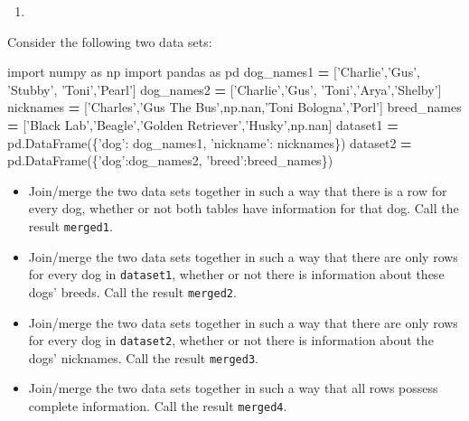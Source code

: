 \documentclass[12pt,krantz2]{krantz}
\makeatletter
\newenvironment{Shaded}{\begin{snugshade}}{\end{snugshade}}
\newcommand{\ImportTok}[1]{#1}
\newcommand{\NormalTok}[1]{#1}
\newcommand{\OperatorTok}[1]{\textcolor[rgb]{0.43,0.43,0.43}{\textbf{#1}}}
\newcommand{\StringTok}[1]{\textcolor[rgb]{0.5,0.5,0.5}{#1}}
\providecommand{\tightlist}{%
  \setlength{\itemsep}{0pt}\setlength{\parskip}{0pt}}
\newenvironment{kframe}{%
\medskip{}
\setlength{\fboxsep}{.8em}
 \def\at@end@of@kframe{}%
 \ifinner\ifhmode%
  \def\at@end@of@kframe{\end{minipage}}%
  \begin{minipage}{\columnwidth}%
 \fi\fi%
 \def\FrameCommand##1{\hskip\@totalleftmargin \hskip-\fboxsep
 \colorbox{shadecolor}{##1}\hskip-\fboxsep
     \hskip-\linewidth \hskip-\@totalleftmargin \hskip\columnwidth}%
 \MakeFramed {\advance\hsize-\width
   \@totalleftmargin\z@ \linewidth\hsize
   \@setminipage}}%
 {\par\unskip\endMakeFramed%
 \at@end@of@kframe}
\renewenvironment{Shaded}{\begin{kframe}}{\end{kframe}}
\makeatother
\begin{document}
\begin{enumerate}
\def\labelenumi{\arabic{enumi}.}
\setcounter{enumi}{2}
\item
\end{enumerate}

Consider the following two data sets:

\begin{Shaded}
\begin{Highlighting}[]
\ImportTok{import}\NormalTok{ numpy }\ImportTok{as}\NormalTok{ np}
\ImportTok{import}\NormalTok{ pandas }\ImportTok{as}\NormalTok{ pd}
\NormalTok{dog_names1 }\OperatorTok{=}\NormalTok{ [}\StringTok{'Charlie'}\NormalTok{,}\StringTok{'Gus'}\NormalTok{, }\StringTok{'Stubby'}\NormalTok{, }\StringTok{'Toni'}\NormalTok{,}\StringTok{'Pearl'}\NormalTok{]}
\NormalTok{dog_names2 }\OperatorTok{=}\NormalTok{ [}\StringTok{'Charlie'}\NormalTok{,}\StringTok{'Gus'}\NormalTok{, }\StringTok{'Toni'}\NormalTok{,}\StringTok{'Arya'}\NormalTok{,}\StringTok{'Shelby'}\NormalTok{]}
\NormalTok{nicknames }\OperatorTok{=}\NormalTok{ [}\StringTok{'Charles'}\NormalTok{,}\StringTok{'Gus The Bus'}\NormalTok{,np.nan,}\StringTok{'Toni Bologna'}\NormalTok{,}\StringTok{'Porl'}\NormalTok{]}
\NormalTok{breed_names }\OperatorTok{=}\NormalTok{ [}\StringTok{'Black Lab'}\NormalTok{,}\StringTok{'Beagle'}\NormalTok{,}\StringTok{'Golden Retriever'}\NormalTok{,}\StringTok{'Husky'}\NormalTok{,np.nan]}
\NormalTok{dataset1 }\OperatorTok{=}\NormalTok{ pd.DataFrame(\{}\StringTok{'dog'}\NormalTok{: dog_names1,}
                        \StringTok{'nickname'}\NormalTok{: nicknames\})}
\NormalTok{dataset2 }\OperatorTok{=}\NormalTok{ pd.DataFrame(\{}\StringTok{'dog'}\NormalTok{:dog_names2,}
                        \StringTok{'breed'}\NormalTok{:breed_names\})}
\end{Highlighting}
\end{Shaded}

\begin{itemize}
\tightlist
\item
  Join/merge the two data sets together in such a way that there is a row for every dog, whether or not both tables have information for that dog. Call the result \texttt{merged1}.
\item
  Join/merge the two data sets together in such a way that there are only rows for every dog in \texttt{dataset1}, whether or not there is information about these dogs' breeds. Call the result \texttt{merged2}.
\item
  Join/merge the two data sets together in such a way that there are only rows for every dog in \texttt{dataset2}, whether or not there is information about the dogs' nicknames. Call the result \texttt{merged3}.
\item
  Join/merge the two data sets together in such a way that all rows possess complete information. Call the result \texttt{merged4}.
\end{itemize}
\end{document}
